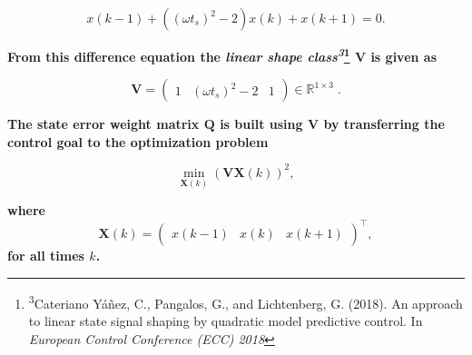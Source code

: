 \documentclass[a0paper,portrait]{baposter}
\begin{document}
\begin{poster}
{\vspace{-.5em}
\begin{equation*}
x(k-1)+\left((\omega t_s)^2 -2\right)x(k)+x(k+1)=0.
\end{equation*}

\textbf{From this difference equation the \textit{linear shape class\textsuperscript{3}}{\renewcommand*\@makefnmark{}\footnote{\textsuperscript{3}Cateriano Y\'a\~nez, C., Pangalos, G., and Lichtenberg, G. (2018). An approach to linear state signal shaping by quadratic model predictive control. In \textit{European Control Conference (ECC) 2018 \vspace{-.4em}}}\makeatother} $\mathbf{V}$ is given as}

\vspace{-.3em}
\begin{equation*}
\mathbf{V} = 
\left( \begin{array}{ccc} 
1 & (\omega t_s)^2 -2 & 1
\end{array} \right)\in \mathbb{R}^{1 \times 3} \; .
\end{equation*}

\textbf{The state error weight matrix $\mathbf{Q}$ is built using $\mathbf{V}$ by transferring the control goal to the optimization problem}

\vspace{-.3em}
\begin{equation*}
\min_{\mathbf{X}(k)} \left( \mathbf{V}\mathbf{X}(k) \right)^2,
\end{equation*}

\vspace{-.7em}
\textbf{where}
\small
\begin{equation*} 
\mathbf{X}(k) =  \left(\begin{array}{ccc} x(k-1) & x(k) & x(k+1) \end{array} \right)^\intercal\!,
\end{equation*}
\normalsize
\textbf{for all times $k$.}

\vspace{.56em}
}



\end{poster}
\end{document}
